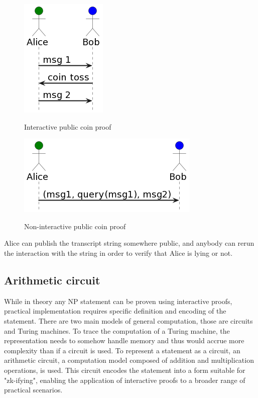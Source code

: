 \documentclass[conference,comsoc,10pt]{IEEEtran}
\begin{document}
        \begin{figure}[h]
            \centering
            \includegraphics[scale=0.4]{../bachelor/assets/images/interactive_coin.png}
            \caption{Interactive public coin proof}
            \label{fig:interactive_coin}
            \cite{Goldwasser1986, youtubeMOOCLecture1}
            \vspace{0.5cm}
        \end{figure}

        \begin{figure}[h]
            \centering
            \includegraphics[scale=0.4]{../bachelor/assets/images/non_interactive_coin.png}
            \caption{Non-interactive public coin proof}
            \label{fig:non_interactive_coin}
            \cite{Fiat, youtubeMOOCLecture1}
            \vspace{0.5cm}
        \end{figure}

        Alice can publish the transcript string somewhere public, and anybody
        can rerun the interaction with the string in order to verify that Alice
        is lying or not.

    \subsection{Arithmetic circuit}

        While in theory any NP statement \cite{goldreich1991proofs} can be proven using
        interactive proofs, practical implementation requires specific definition and
        encoding of the statement. There are two main models of general computation,
        those are circuits and Turing machines. To trace the computation of a Turing
        machine, the representation needs to somehow handle memory and thus would accrue
        more complexity than if a circuit is used. To represent a statement as a
        circuit, an arithmetic circuit, a computation model composed of addition and
        multiplication operations, is used. This circuit encodes the statement into a
        form suitable for "zk-ifying", enabling the application of interactive proofs
        to a broader range of practical scenarios.
\end{document}
